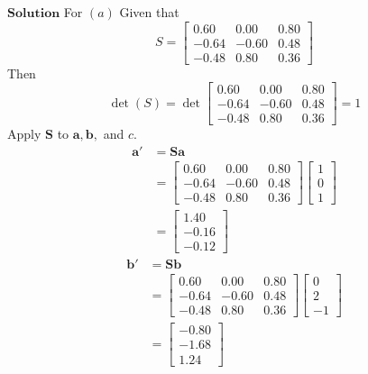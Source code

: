 \documentclass{styles/kaobook}
\begin{document}
$\boxed{\textbf{Solution}}$ For $(a)$ Given that
$$S=\begin{bmatrix}0.60 & 0.00 & 0.80 \\ -0.64 & -0.60 & 0.48 \\ -0.48 & 0.80 & 0.36\end{bmatrix}$$
Then
$$
\operatorname{det}(S)=\operatorname{det}\begin{bmatrix}
0.60 & 0.00 & 0.80 \\
-0.64 & -0.60 & 0.48 \\
-0.48 & 0.80 & 0.36
\end{bmatrix}=1
$$
Apply $\mathbf{S}$ to $\mathbf{a}, \mathbf{b},$ and $c$.
$$
\begin{aligned}
\mathbf{a}' &=\mathbf{S} \mathbf{a} \\
&=\begin{bmatrix}
0.60 & 0.00 & 0.80 \\
-0.64 & -0.60 & 0.48 \\
-0.48 & 0.80 & 0.36
\end{bmatrix}\begin{bmatrix}
1 \\
0 \\
1
\end{bmatrix} \\
&=\begin{bmatrix}
1.40 \\
-0.16 \\
-0.12
\end{bmatrix}
\end{aligned}
$$
$$
\begin{aligned}
\mathbf{b}' &=\mathbf{S} \mathbf{b} \\
&=\begin{bmatrix}
0.60 & 0.00 & 0.80 \\
-0.64 & -0.60 & 0.48 \\
-0.48 & 0.80 & 0.36
\end{bmatrix}\begin{bmatrix}
0 \\
2 \\
-1
\end{bmatrix} \\
&=\begin{bmatrix}
-0.80 \\
-1.68 \\
1.24
\end{bmatrix}
\end{aligned}
$$
\end{document}
